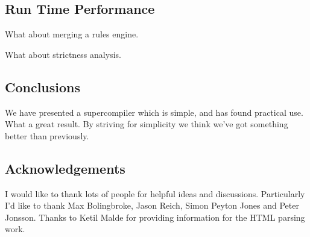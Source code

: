 \documentclass[draft]{sigplanconf}
\begin{document}
\subsection{Run Time Performance}

What about merging a rules engine.

What about strictness analysis.

\subsection{Conclusions}

We have presented a supercompiler which is simple, and has found practical use. What a great result. By striving for simplicity we think we've got something better than previously.


\subsection*{Acknowledgements}

I would like to thank lots of people for helpful ideas and discussions. Particularly I'd like to thank Max Bolingbroke, Jason Reich, Simon Peyton Jones and Peter Jonsson. Thanks to Ketil Malde for providing information for the HTML parsing work.



\end{document}
